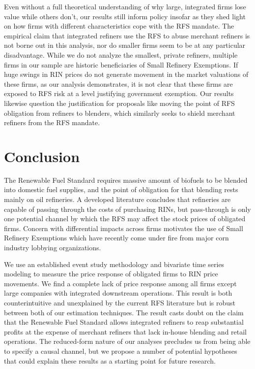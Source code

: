 \documentclass[11pt]{article}
\begin{document}
Even without a full theoretical understanding of why large, integrated firms lose value while others don't, our results still inform policy insofar as they shed light on how firms with different characteristics cope with the RFS mandate. The empirical claim that integrated refiners use the RFS to abuse merchant refiners is not borne out in this analysis, nor do smaller firms seem to be at any particular disadvantage. While we do not analyze the smallest, private refiners, multiple firms in our sample are historic beneficiaries of Small Refinery Exemptions. If huge swings in RIN prices do not generate movement in the market valuations of these firms, as our analysis demonstrates, it is not clear that these firms are exposed to RFS risk at a level justifying government exemption. Our results likewise question the justification for proposals like moving the point of RFS obligation from refiners to blenders, which similarly seeks to shield merchant refiners from the RFS mandate.


\section{Conclusion}

The Renewable Fuel Standard requires massive amount of biofuels to be blended into domestic fuel supplies, and the point of obligation for that blending rests mainly on oil refineries. A developed literature concludes that refineries are capable of passing through the costs of purchasing RINs, but pass-through is only one potential channel by which the RFS may affect the stock prices of obligated firms. Concern with differential impacts across firms motivates the use of Small Refinery Exemptions which have recently come under fire from major corn industry lobbying organizations.

We use an established event study methodology and bivariate time series modeling to measure the price response of obligated firms to RIN price movements. We find a complete lack of price response among all firms except large companies with integrated downstream operations. This result is both counterintuitive and unexplained by the current RFS literature but is robust between both of our estimation techniques. The result casts doubt on the claim that the Renewable Fuel Standard allows integrated refiners to reap substantial profits at the expense of merchant refiners that lack in-house blending and retail operations. The reduced-form nature of our analyses precludes us from being able to specify a causal channel, but we propose a number of potential hypotheses that could explain these results as a starting point for future research.
\end{document}
